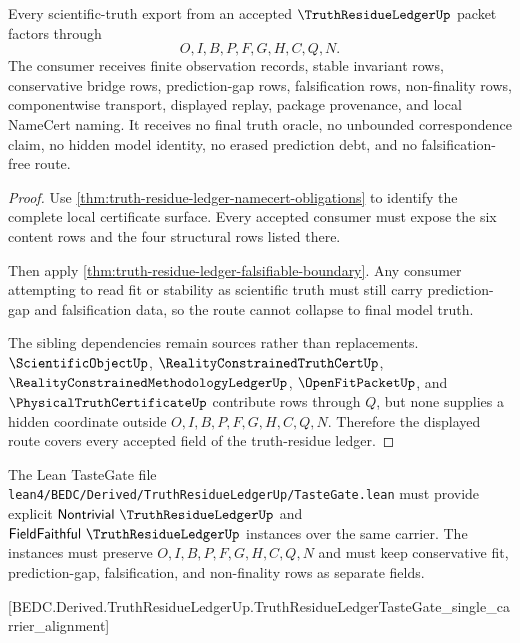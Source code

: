 \begin{theorem}
\label{thm:truth-residue-ledger-field-coverage}
Every scientific-truth export from an accepted $\TruthResidueLedgerUp$ packet factors through
$$
O,I,B,P,F,G,H,C,Q,N.
$$
The consumer receives finite observation records, stable invariant rows, conservative bridge rows, prediction-gap rows, falsification rows, non-finality rows, componentwise transport, displayed replay, package provenance, and local NameCert naming. It receives no final truth oracle, no unbounded correspondence claim, no hidden model identity, no erased prediction debt, and no falsification-free route.
\end{theorem}
\begin{proof}
Use \autoref{thm:truth-residue-ledger-namecert-obligations} to identify the complete local certificate surface. Every accepted consumer must expose the six content rows and the four structural rows listed there.

Then apply \autoref{thm:truth-residue-ledger-falsifiable-boundary}. Any consumer attempting to read fit or stability as scientific truth must still carry prediction-gap and falsification data, so the route cannot collapse to final model truth.

The sibling dependencies remain sources rather than replacements. $\ScientificObjectUp$, $\RealityConstrainedTruthCertUp$, $\RealityConstrainedMethodologyLedgerUp$, $\OpenFitPacketUp$, and $\PhysicalTruthCertificateUp$ contribute rows through $Q$, but none supplies a hidden coordinate outside $O,I,B,P,F,G,H,C,Q,N$. Therefore the displayed route covers every accepted field of the truth-residue ledger.
\end{proof}

The Lean TasteGate file \texttt{lean4/BEDC/Derived/TruthResidueLedgerUp/TasteGate.lean} must provide explicit $\mathsf{Nontrivial}\ \TruthResidueLedgerUp$ and $\mathsf{FieldFaithful}\ \TruthResidueLedgerUp$ instances over the same carrier. The instances must preserve $O,I,B,P,F,G,H,C,Q,N$ and must keep conservative fit, prediction-gap, falsification, and non-finality rows as separate fields.

[BEDC.Derived.TruthResidueLedgerUp.TruthResidueLedgerTasteGate\_single\_carrier\_alignment]

